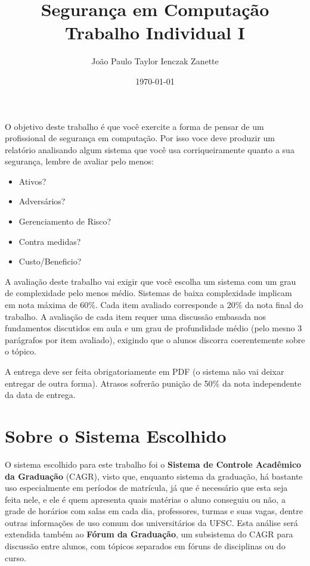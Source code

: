 \documentclass{article}
\title{Segurança em Computação \\ Trabalho Individual I}
\author{João Paulo Taylor Ienczak Zanette}
\date{\today}
\begin{document}
    \maketitle{}

    \begin{superframe}
        O objetivo deste trabalho é que você exercite a forma de pensar de um
        profissional de segurança em computação. Por isso voce deve produzir um
        relatório analisando algum sistema que você usa corriqueiramente quanto
        a sua segurança, lembre de avaliar pelo menos:

        \begin{itemize}
            \item Ativos?
            \item Adversários?
            \item Gerenciamento de Risco?
            \item Contra medidas?
            \item Custo/Beneficio?
        \end{itemize}

        A avaliação deste trabalho vai exigir que você escolha um sistema com
        um grau de complexidade pelo menos médio. Sistemas de baixa
        complexidade implicam em nota máxima de 60\%. Cada item avaliado
        corresponde a 20\% da nota final do trabalho. A avaliação de cada item
        requer uma discussão embasada nos fundamentos discutidos em aula e um
        grau de profundidade médio (pelo mesno 3 parágrafos por item avaliado),
        exigindo que o alunos discorra coerentemente sobre o tópico.

        A entrega deve ser feita obrigatoriamente em PDF (o sistema não vai
        deixar entregar de outra forma). Atrasos sofrerão punição de 50\% da
        nota independente da data de entrega.
    \end{superframe}

    \section{Sobre o Sistema Escolhido}

    O sistema escolhido para este trabalho foi o \textbf{Sistema de Controle
    Acadêmico da Graduação} (CAGR), visto que, enquanto sistema da graduação,
    há bastante uso especialmente em períodos de matrícula, já que é necessário
    que esta seja feita nele, e ele é quem apresenta quais matérias o aluno
    conseguiu ou não, a grade de horários com salas em cada dia, professores,
    turmas e suas vagas, dentre outras informações de uso comum dos
    universitários da UFSC\@. Esta análise será extendida também ao
    \textbf{Fórum da Graduação}, um subsistema do CAGR para discussão entre
    alunos, com tópicos separados em fóruns de disciplinas ou do curso.
\end{document}
